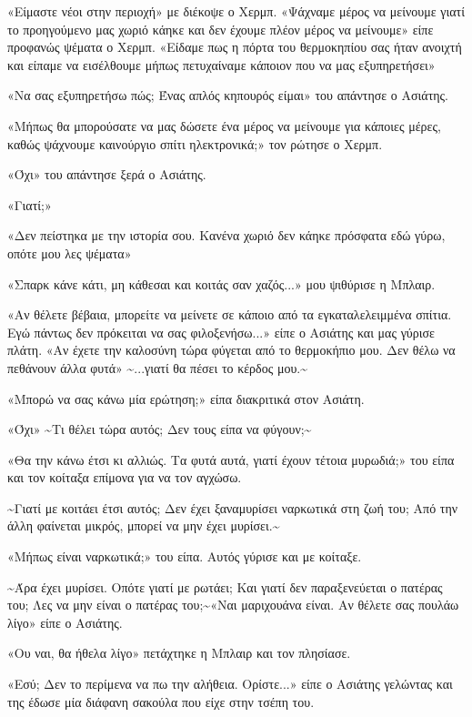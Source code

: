 \documentclass[12pt,twoside, openany]{book}
\begin{document}
«Είμαστε νέοι στην περιοχή» με διέκοψε ο Χερμπ. «Ψάχναμε μέρος να μείνουμε γιατί το προηγούμενο μας χωριό κάηκε και δεν έχουμε πλέον μέρος να μείνουμε» είπε προφανώς ψέματα ο Χερμπ. «Είδαμε πως η πόρτα του θερμοκηπίου σας ήταν ανοιχτή και είπαμε να εισέλθουμε μήπως πετυχαίναμε κάποιον που να μας εξυπηρετήσει»

«Να σας εξυπηρετήσω πώς; Ένας απλός κηπουρός είμαι» του απάντησε ο Ασιάτης.

«Μήπως θα μπορούσατε να μας δώσετε ένα μέρος να μείνουμε για κάποιες μέρες, καθώς ψάχνουμε καινούργιο σπίτι ηλεκτρονικά;» τον ρώτησε ο Χερμπ.

«Όχι» του απάντησε ξερά ο Ασιάτης.

«Γιατί;»

«Δεν πείστηκα με την ιστορία σου. Κανένα χωριό δεν κάηκε πρόσφατα εδώ γύρω, οπότε μου λες ψέματα»

«Σπαρκ κάνε κάτι, μη κάθεσαι και κοιτάς σαν χαζός...» μου ψιθύρισε η Μπλαιρ.

«Αν θέλετε βέβαια, μπορείτε να μείνετε σε κάποιο από τα εγκαταλελειμμένα σπίτια. Εγώ πάντως δεν πρόκειται να σας φιλοξενήσω...» είπε ο Ασιάτης και μας γύρισε πλάτη. «Αν έχετε την καλοσύνη τώρα φύγεται από το θερμοκήπιο μου. Δεν θέλω να πεθάνουν άλλα φυτά» \textasciitilde ...γιατί θα πέσει το κέρδος μου.\textasciitilde 

«Μπορώ να σας κάνω μία ερώτηση;» είπα διακριτικά στον Ασιάτη.

«Όχι» \textasciitilde Τι θέλει τώρα αυτός; Δεν τους είπα να φύγουν;\textasciitilde 

«Θα την κάνω έτσι κι αλλιώς. Τα φυτά αυτά, γιατί έχουν τέτοια μυρωδιά;» του είπα και τον κοίταξα επίμονα για να τον αγχώσω.

\textasciitilde Γιατί με κοιτάει έτσι αυτός; Δεν έχει ξαναμυρίσει ναρκωτικά στη ζωή του; Από την άλλη φαίνεται μικρός, μπορεί να μην έχει μυρίσει.\textasciitilde 

«Μήπως είναι ναρκωτικά;» του είπα. Αυτός γύρισε και με κοίταξε.

\textasciitilde Άρα έχει μυρίσει. Οπότε γιατί με ρωτάει; Και γιατί δεν παραξενεύεται ο πατέρας του; Λες να μην είναι ο πατέρας του;\textasciitilde  «Ναι μαριχουάνα είναι. Αν θέλετε σας πουλάω λίγο» είπε ο Ασιάτης.

«Ου ναι, θα ήθελα λίγο» πετάχτηκε η Μπλαιρ και τον πλησίασε.

«Εσύ; Δεν το περίμενα να πω την αλήθεια. Ορίστε...» είπε ο Ασιάτης γελώντας και της έδωσε μία διάφανη σακούλα που είχε στην τσέπη του.
\end{document}

